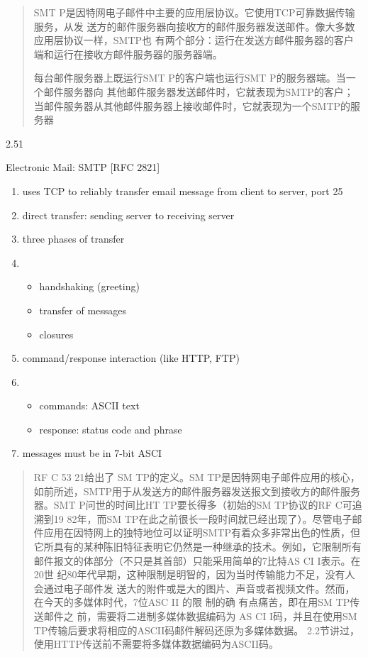 \documentclass[
]{article}
\begin{document}
\begin{quote}
SMT P是因特网电子邮件中主要的应用层协议。它使用TCP可靠数据传输服务，从发
送方的邮件服务器向接收方的邮件服务器发送邮件。像大多数应用层协议一样，SMTP也
有两个部分：运行在发送方邮件服务器的客户端和运行在接收方邮件服务器的服务器端。

每台邮件服务器上既运行SMT P的客户端也运行SMT
P的服务器端。当一个邮件服务器向
其他邮件服务器发送邮件时，它就表现为SMTP的客户；当邮件服务器从其他邮件服务器上接收邮件时，它就表现为一个SMTP的服务器
\end{quote}

2.51

Electronic Mail: SMTP {[}RFC 2821{]}

\begin{enumerate}
\def\labelenumi{\arabic{enumi}.}
\item
  uses TCP to reliably transfer email message from client to server,
  port 25
\item
  direct transfer: sending server to receiving server
\item
  three phases of transfer
\item
  \begin{itemize}
  \item
    handshaking (greeting)
  \item
    transfer of messages
  \item
    closures
  \end{itemize}
\item
  command/response interaction (like HTTP, FTP)
\item
  \begin{itemize}
  \item
    commands: ASCII text
  \item
    response: status code and phrase
  \end{itemize}
\item
  messages must be in 7-bit ASCI
\end{enumerate}

\begin{quote}
RF C 53 21给出了 SM TP的定义。SM
TP是因特网电子邮件应用的核心，如前所述，SMTP用于从发送方的邮件服务器发送报文到接收方的邮件服务器。SMT
P问世的时间比HT TP要长得多（初始的SM TP协议的RF C可追溯到19 82年，而SM
TP在此之前很长一段时间就已经出现了）。尽管电子邮件应用在因特网上的独特地位可以证明SMTP有着众多非常出色的性质，但它所具有的某种陈旧特征表明它仍然是一种继承的技术。例如，它限制所有邮件报文的体部分（不只是其首部）只能采用简单的7比特AS
CI I表示。在20世
纪80年代早期，这种限制是明智的，因为当时传输能力不足，没有人会通过电子邮件发
送大的附件或是大的图片、声音或者视频文件。然而，在今天的多媒体时代，7位ASC
II 的限 制的确 有点痛苦，即在用SM TP传送邮件之
前，需要将二进制多媒体数据编码为 AS CI I码，并且在使用SM
TP传输后要求将相应的ASCII码邮件解码还原为多媒体数据。
2.2节讲过，使用HTTP传送前不需要将多媒体数据编码为ASCII码。
\end{quote}
\end{document}
